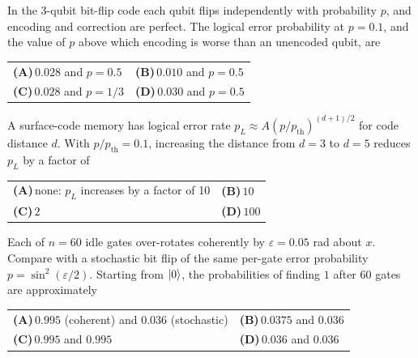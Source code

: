 \documentclass[11pt,a4paper]{article}
\newcommand{\optlabel}[1]{\textbf{(#1)}}
\newenvironment{qitem}[1]{\begin{list}{}{\setlength{\leftmargin}{3.3em}\setlength{\labelwidth}{3.1em}%
  \setlength{\labelsep}{0.2em}\setlength{\topsep}{3pt}\setlength{\parsep}{3pt}}\item[\textbf{Q.#1}\hfill]}{\end{list}}
\newcommand{\qsep}{\par\vspace{2pt}{\color{black!15}\hrule}\vspace{4pt}}
\begin{document}
\begin{qitem}{70}
In the 3-qubit bit-flip code each qubit flips independently with probability $p$, and encoding and correction are perfect. The logical error probability at $p = 0.1$, and
the value of $p$ above which encoding is worse than an unencoded qubit, are
\par\smallskip\noindent\begin{tabularx}{\linewidth}{@{}*{2}{L}@{}}
\optlabel{A}\,$0.028$ and $p = 0.5$ & \optlabel{B}\,$0.010$ and $p = 0.5$ \\[3pt]
\optlabel{C}\,$0.028$ and $p = 1/3$ & \optlabel{D}\,$0.030$ and $p = 0.5$
\end{tabularx}
\end{qitem}
\qsep

\begin{qitem}{71}
A surface-code memory has logical error rate $p_L \approx A(p/p_{\text{th}})^{(d+1)/2}$ for code distance $d$. With $p/p_{\text{th}} = 0.1$, increasing the distance from
$d = 3$ to $d = 5$ reduces $p_L$ by a factor of
\par\smallskip\noindent\begin{tabularx}{\linewidth}{@{}*{2}{L}@{}}
\optlabel{A}\,none: $p_L$ increases by a factor of 10 & \optlabel{B}\,$10$ \\[3pt]
\optlabel{C}\,$2$ & \optlabel{D}\,$100$
\end{tabularx}
\end{qitem}
\qsep

\begin{qitem}{72}
Each of $n = 60$ idle gates over-rotates coherently by $\varepsilon = 0.05$ rad about $x$. Compare with a stochastic bit flip of the same per-gate error probability
$p = \sin^2(\varepsilon/2)$. Starting from $\ket0$, the probabilities of finding $1$ after 60 gates are approximately
\par\smallskip\noindent\begin{tabularx}{\linewidth}{@{}*{2}{L}@{}}
\optlabel{A}\,$0.995$ (coherent) and $0.036$ (stochastic) & \optlabel{B}\,$0.0375$ and $0.036$ \\[3pt]
\optlabel{C}\,$0.995$ and $0.995$ & \optlabel{D}\,$0.036$ and $0.036$
\end{tabularx}
\end{qitem}
\qsep
\end{document}
